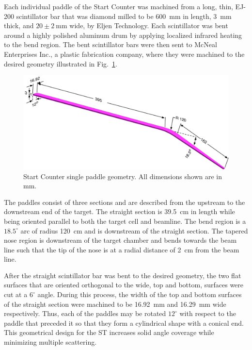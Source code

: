 Each individual paddle of the Start Counter was machined from a long, thin,  EJ-200 scintillator bar that was diamond milled to be 600~mm in length, 3~mm thick, and $\mathrm{20 \pm 2\ mm}$ wide, by Eljen Technology.  Each scintillator was bent around a highly polished aluminum drum by applying localized infrared heating to the bend region.  The bent scintillator bars were then sent to McNeal Enterprises Inc.\cite{mcneal}, a plastic fabrication company, where they were machined to the desired geometry illustrated in Fig.~\ref{fig:stpaddleiso}.
	\begin{figure}[!htb]
		\centering
		\includegraphics[width=1.0\columnwidth]{design/figs/scintillator.pdf}
		\caption{Start Counter single paddle geometry. All dimensions shown are in mm.}
		\label{fig:stpaddleiso}
	\end{figure}

The paddles consist of three sections and are described from the upstream to the downstream end of the target.  The straight section is 39.5~cm in length while being oriented parallel to both the target cell and beamline.  The bend region is a $18.5^{\circ}$ arc of radius 120~cm and is downstream of the straight section. The tapered nose region is downstream of the target chamber and bends towards the beam line such that the tip of the nose is at a radial distance of 2~cm from the beam line.  

After the straight scintillator bar was bent to the desired geometry, the two flat surfaces that are oriented orthogonal to the wide, top and bottom, surfaces were cut at a $6^{\circ}$ angle.  During this process, the width of the top and bottom surfaces of the straight section were machined to be 16.92~mm and 16.29~mm wide respectively. Thus, each of the paddles may be rotated $12^{\circ}$ with respect to the paddle that preceded it so that they form a cylindrical shape with a conical end.  This geometrical design for the ST increases solid angle coverage while minimizing multiple scattering.  

